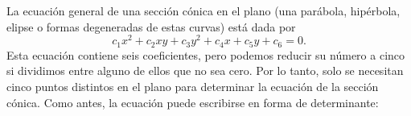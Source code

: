 La ecuación general de una sección cónica en el plano (una parábola, hipérbola, elipse o formas degeneradas de estas curvas) está dada por
$$c_1x^2 + c_2xy + c_3y^2 + c_4x + c_5y + c_6 = 0.$$
\newpage\noindent
Esta ecuación contiene seis coeficientes, pero podemos reducir su número a cinco si dividimos entre alguno de ellos que no sea cero. Por lo tanto, solo se necesitan cinco puntos distintos en el plano para determinar la ecuación de la sección cónica. Como antes, la ecuación puede escribirse en forma de determinante:
\begin{matriz}
     \label{conica10}
\end{matriz}

